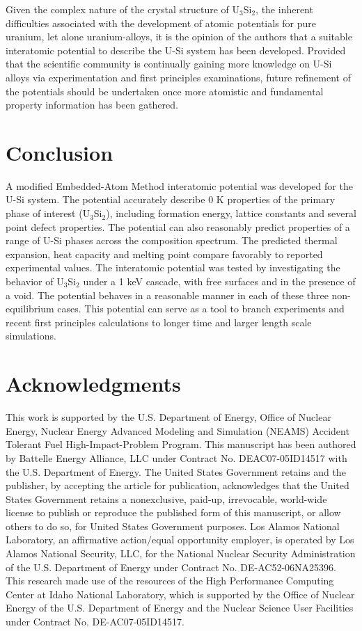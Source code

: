 \documentclass[review]{elsarticle}
\begin{document}
Given the complex nature of the crystal structure of U$_{3}$Si$_{2}$, the inherent difficulties associated with the development of atomic potentials for pure uranium, let alone uranium-alloys, it is the opinion of the authors that a suitable interatomic potential to describe the U-Si system has been developed.  Provided that the scientific community is continually gaining more knowledge on U-Si alloys via experimentation and first principles examinations, future refinement of the potentials should be undertaken once more atomistic and fundamental property information has been gathered.  

\section{Conclusion}

A modified Embedded-Atom Method interatomic potential was developed for the U-Si system.  The potential accurately describe 0 K properties of the primary phase of interest (U$_{3}$Si$_{2}$), including formation energy, lattice constants and several point defect properties.  The potential can also reasonably predict properties of a range of U-Si phases across the composition spectrum.  The predicted thermal expansion, heat capacity and melting point compare favorably to reported experimental values.  The interatomic potential was tested by investigating the behavior of U$_{3}$Si$_{2}$ under a 1 keV cascade, with free surfaces and in the presence of a void.  The potential behaves in a reasonable manner in each of these three non-equilibrium cases.  This potential can serve as a tool to branch experiments and recent first principles calculations to longer time and larger length scale simulations.

\section{Acknowledgments}
This work is supported by the U.S. Department of Energy, Office of Nuclear Energy, Nuclear Energy Advanced Modeling and Simulation (NEAMS) Accident Tolerant Fuel High-Impact-Problem Program. This manuscript has been authored by Battelle Energy Alliance, LLC under Contract No. DEAC07-05ID14517 with the U.S. Department of Energy. The United States Government retains and the publisher, by accepting the article for publication, acknowledges that the United States Government retains a nonexclusive, paid-up, irrevocable, world-wide license to publish or reproduce the published form of this manuscript, or allow others to do so, for United States Government purposes.  Los Alamos National Laboratory, an affirmative action/equal opportunity employer, is operated by Los Alamos National Security, LLC, for the National Nuclear Security Administration of the U.S. Department of Energy under Contract No. DE-AC52-06NA25396.  This research made use of the resources of the High Performance Computing Center at Idaho National Laboratory, which is supported by the Office of Nuclear Energy of the U.S. Department of Energy and the Nuclear Science User Facilities under Contract No. DE-AC07-05ID14517.
\end{document}
